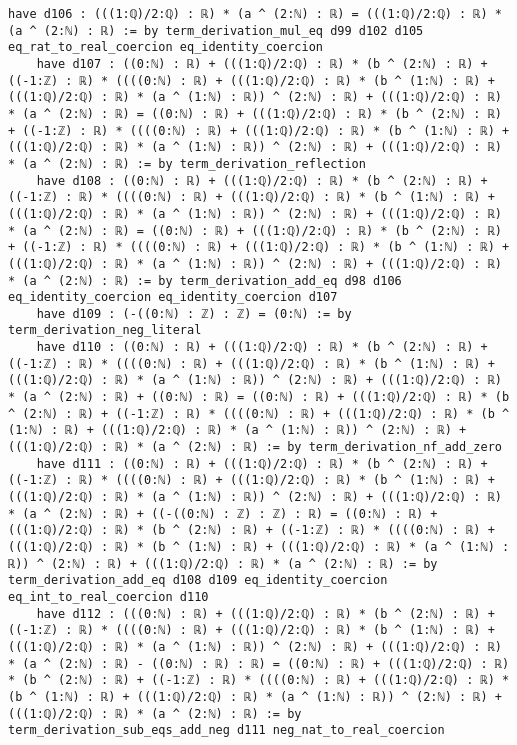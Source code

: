 \documentclass{article}
\begin{document}
\begin{tcolorbox}[colback=white!10, width=\linewidth]
\begin{lstlisting}[language=Lean4]
    have d106 : (((1:ℚ)/2:ℚ) : ℝ) * (a ^ (2:ℕ) : ℝ) = (((1:ℚ)/2:ℚ) : ℝ) * (a ^ (2:ℕ) : ℝ) := by term_derivation_mul_eq d99 d102 d105 eq_rat_to_real_coercion eq_identity_coercion
    have d107 : ((0:ℕ) : ℝ) + (((1:ℚ)/2:ℚ) : ℝ) * (b ^ (2:ℕ) : ℝ) + ((-1:ℤ) : ℝ) * ((((0:ℕ) : ℝ) + (((1:ℚ)/2:ℚ) : ℝ) * (b ^ (1:ℕ) : ℝ) + (((1:ℚ)/2:ℚ) : ℝ) * (a ^ (1:ℕ) : ℝ)) ^ (2:ℕ) : ℝ) + (((1:ℚ)/2:ℚ) : ℝ) * (a ^ (2:ℕ) : ℝ) = ((0:ℕ) : ℝ) + (((1:ℚ)/2:ℚ) : ℝ) * (b ^ (2:ℕ) : ℝ) + ((-1:ℤ) : ℝ) * ((((0:ℕ) : ℝ) + (((1:ℚ)/2:ℚ) : ℝ) * (b ^ (1:ℕ) : ℝ) + (((1:ℚ)/2:ℚ) : ℝ) * (a ^ (1:ℕ) : ℝ)) ^ (2:ℕ) : ℝ) + (((1:ℚ)/2:ℚ) : ℝ) * (a ^ (2:ℕ) : ℝ) := by term_derivation_reflection
    have d108 : ((0:ℕ) : ℝ) + (((1:ℚ)/2:ℚ) : ℝ) * (b ^ (2:ℕ) : ℝ) + ((-1:ℤ) : ℝ) * ((((0:ℕ) : ℝ) + (((1:ℚ)/2:ℚ) : ℝ) * (b ^ (1:ℕ) : ℝ) + (((1:ℚ)/2:ℚ) : ℝ) * (a ^ (1:ℕ) : ℝ)) ^ (2:ℕ) : ℝ) + (((1:ℚ)/2:ℚ) : ℝ) * (a ^ (2:ℕ) : ℝ) = ((0:ℕ) : ℝ) + (((1:ℚ)/2:ℚ) : ℝ) * (b ^ (2:ℕ) : ℝ) + ((-1:ℤ) : ℝ) * ((((0:ℕ) : ℝ) + (((1:ℚ)/2:ℚ) : ℝ) * (b ^ (1:ℕ) : ℝ) + (((1:ℚ)/2:ℚ) : ℝ) * (a ^ (1:ℕ) : ℝ)) ^ (2:ℕ) : ℝ) + (((1:ℚ)/2:ℚ) : ℝ) * (a ^ (2:ℕ) : ℝ) := by term_derivation_add_eq d98 d106 eq_identity_coercion eq_identity_coercion d107
    have d109 : (-((0:ℕ) : ℤ) : ℤ) = (0:ℕ) := by term_derivation_neg_literal
    have d110 : ((0:ℕ) : ℝ) + (((1:ℚ)/2:ℚ) : ℝ) * (b ^ (2:ℕ) : ℝ) + ((-1:ℤ) : ℝ) * ((((0:ℕ) : ℝ) + (((1:ℚ)/2:ℚ) : ℝ) * (b ^ (1:ℕ) : ℝ) + (((1:ℚ)/2:ℚ) : ℝ) * (a ^ (1:ℕ) : ℝ)) ^ (2:ℕ) : ℝ) + (((1:ℚ)/2:ℚ) : ℝ) * (a ^ (2:ℕ) : ℝ) + ((0:ℕ) : ℝ) = ((0:ℕ) : ℝ) + (((1:ℚ)/2:ℚ) : ℝ) * (b ^ (2:ℕ) : ℝ) + ((-1:ℤ) : ℝ) * ((((0:ℕ) : ℝ) + (((1:ℚ)/2:ℚ) : ℝ) * (b ^ (1:ℕ) : ℝ) + (((1:ℚ)/2:ℚ) : ℝ) * (a ^ (1:ℕ) : ℝ)) ^ (2:ℕ) : ℝ) + (((1:ℚ)/2:ℚ) : ℝ) * (a ^ (2:ℕ) : ℝ) := by term_derivation_nf_add_zero
    have d111 : ((0:ℕ) : ℝ) + (((1:ℚ)/2:ℚ) : ℝ) * (b ^ (2:ℕ) : ℝ) + ((-1:ℤ) : ℝ) * ((((0:ℕ) : ℝ) + (((1:ℚ)/2:ℚ) : ℝ) * (b ^ (1:ℕ) : ℝ) + (((1:ℚ)/2:ℚ) : ℝ) * (a ^ (1:ℕ) : ℝ)) ^ (2:ℕ) : ℝ) + (((1:ℚ)/2:ℚ) : ℝ) * (a ^ (2:ℕ) : ℝ) + ((-((0:ℕ) : ℤ) : ℤ) : ℝ) = ((0:ℕ) : ℝ) + (((1:ℚ)/2:ℚ) : ℝ) * (b ^ (2:ℕ) : ℝ) + ((-1:ℤ) : ℝ) * ((((0:ℕ) : ℝ) + (((1:ℚ)/2:ℚ) : ℝ) * (b ^ (1:ℕ) : ℝ) + (((1:ℚ)/2:ℚ) : ℝ) * (a ^ (1:ℕ) : ℝ)) ^ (2:ℕ) : ℝ) + (((1:ℚ)/2:ℚ) : ℝ) * (a ^ (2:ℕ) : ℝ) := by term_derivation_add_eq d108 d109 eq_identity_coercion eq_int_to_real_coercion d110
    have d112 : (((0:ℕ) : ℝ) + (((1:ℚ)/2:ℚ) : ℝ) * (b ^ (2:ℕ) : ℝ) + ((-1:ℤ) : ℝ) * ((((0:ℕ) : ℝ) + (((1:ℚ)/2:ℚ) : ℝ) * (b ^ (1:ℕ) : ℝ) + (((1:ℚ)/2:ℚ) : ℝ) * (a ^ (1:ℕ) : ℝ)) ^ (2:ℕ) : ℝ) + (((1:ℚ)/2:ℚ) : ℝ) * (a ^ (2:ℕ) : ℝ) - ((0:ℕ) : ℝ) : ℝ) = ((0:ℕ) : ℝ) + (((1:ℚ)/2:ℚ) : ℝ) * (b ^ (2:ℕ) : ℝ) + ((-1:ℤ) : ℝ) * ((((0:ℕ) : ℝ) + (((1:ℚ)/2:ℚ) : ℝ) * (b ^ (1:ℕ) : ℝ) + (((1:ℚ)/2:ℚ) : ℝ) * (a ^ (1:ℕ) : ℝ)) ^ (2:ℕ) : ℝ) + (((1:ℚ)/2:ℚ) : ℝ) * (a ^ (2:ℕ) : ℝ) := by term_derivation_sub_eqs_add_neg d111 neg_nat_to_real_coercion

\end{lstlisting}
\end{tcolorbox}
\end{document}
